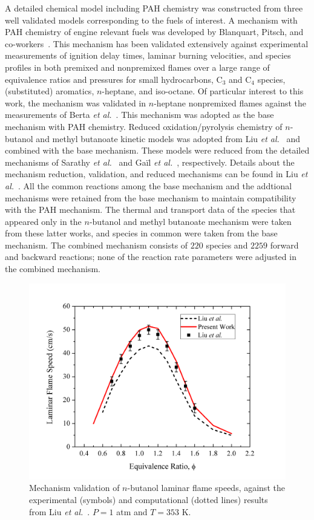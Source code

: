A detailed chemical model including PAH chemistry was constructed from three well validated models corresponding to the fuels of interest. A mechanism with PAH chemistry of engine relevant fuels was developed by Blanquart, Pitsch, and co-workers~\cite{blanquart09b,narayanaswamy10}. This mechanism has been validated extensively against experimental measurements of ignition delay times, laminar burning velocities, and species profiles in both premixed and nonpremixed flames over a large range of equivalence ratios and pressures for small hydrocarbons, C$_3$ and C$_4$ species, (substituted) aromatics, $n$-heptane, and iso-octane. Of particular interest to this work, the mechanism was validated in $n$-heptane nonpremixed flames against the measurements of Berta \emph{et al.}~\cite{berta06}.  This mechanism was adopted as the base mechanism with PAH chemistry. Reduced oxidation/pyrolysis chemistry of $n$-butanol and methyl butanoate kinetic models was adopted from Liu \emph{et al.}~\cite{liu11} and combined with the base mechanism.  These models were reduced from the detailed mechanisms of Sarathy \emph{et al.}~\cite{sarathy09} and Ga\"il \emph{et al.}~\cite{gail08}, respectively. Details about the mechanism reduction, validation, and reduced mechanisms can be found in Liu \emph{et al.}~\cite{liu11}.  All the common reactions among the base mechanism and the addtional mechanisms were retained from the base mechanism to maintain compatibility with the PAH mechanism. The thermal and transport data of the species that appeared only in the $n$-butanol and methyl butanoate mechanism were taken from these latter works, and species in common were taken from the base mechanism. The combined mechanism consists of $220$ species and $2259$ forward and backward reactions; none of the reaction rate parameters were adjusted in the combined mechanism.

\begin{figure}[t]
  \centering
  \scriptsize
  \includegraphics[width=1.0\textwidth]{ch-biofuel/NB.png}
  \normalsize
  \caption{Mechanism validation of $n$-butanol laminar flame speeds, against the experimental (symbols) and computational (dotted lines) results from Liu \emph{et al.}~\cite{liu11}. $P=1$ atm and $T=353$ K.}
  \label{fig:validation_NB}
\end{figure}

